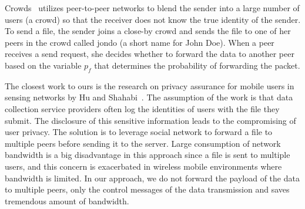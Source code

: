 Crowds~\cite{DBLP:journals/cacm/ReiterR99} utilizes peer-to-peer
networks to blend the sender into a large number of users (a
crowd) so that the receiver does not know the true identity of the
sender. To send a file, the sender joins a close-by crowd and
sends the file to one of her peers in the crowd called jondo (a
short name for John Doe). When a peer receives a send request, she
decides whether to forward the data to another peer based on the
variable $p_f$ that determines the probability of forwarding the
packet.

The closest work to ours is the research on privacy assurance for
mobile users in sensing networks by Hu and
Shahabi~\cite{DBLP:conf/percom/HuS10}. The assumption of the work
is that data collection service providers often log the identities
of users with the file they submit. The disclosure of this
sensitive information leads to the compromising of user privacy.
The solution is to leverage social network to forward a file to
multiple peers before sending it to the server. Large consumption
of network bandwidth is a big disadvantage in this approach since
a file is sent to multiple users, and this concern is exacerbated
in wireless mobile environments where bandwidth is limited. In our
approach, we do not forward the payload of the data to multiple
peers, only the control messages of the data transmission and
saves tremendous amount of bandwidth.
